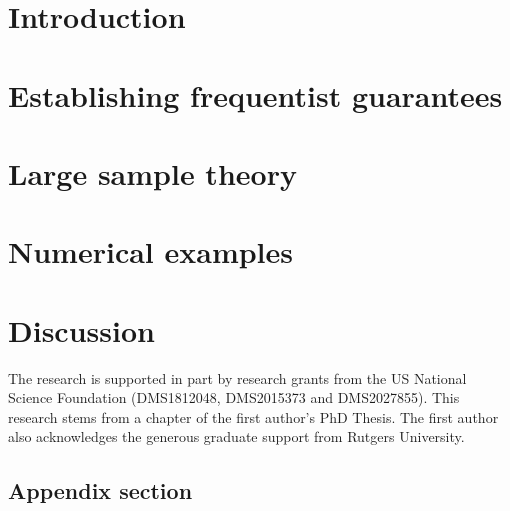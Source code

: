\documentclass{nejsds}
\theoremstyle{remark}
\begin{document}
\section{Introduction} \label{sec:intro}
	
\section{Establishing frequentist guarantees}\label{sec:thms}
	 
\section{Large sample theory}\label{sec:largeSamp}
	
\section{Numerical examples} \label{sec:ex}

\section{Discussion} \label{sec:discuss}



\begin{acknowledgement}%
\end{acknowledgement}

\begin{funding}
The research is supported in part by research grants from the US National Science Foundation %
(DMS1812048, DMS2015373 and DMS2027855). 
This research stems from a chapter of the first author's PhD Thesis. 
The first author also acknowledges the generous graduate support from Rutgers University.
\end{funding}

\begin{esm}
\esmdescription{}
\esmfilename{}

\end{esm}

\begin{appendix}
\section{Appendix section}

\end{appendix}


	

	
\end{document}

